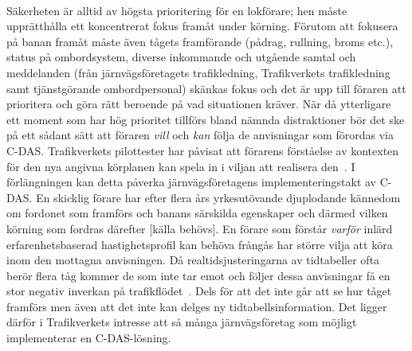 \paragraph{}
Säkerheten är alltid av högsta prioritering för en lokförare; hen måste upprätthålla ett koncentrerat fokus framåt under körning.
Förutom att fokusera på banan framåt måste även tågets framförande (pådrag, rullning, broms etc.), status på ombordsystem, diverse inkommande och utgående samtal och meddelanden (från järnvägsföretagets trafikledning, Trafikverkets trafikledning samt tjänstgörande ombordpersonal) skänkas fokus och det är upp till föraren att prioritera och göra rätt beroende på vad situationen kräver.
När då ytterligare ett moment som har hög prioritet tillförs bland nämnda distraktioner bör det ske på ett sådant sätt att föraren \emph{vill} och \emph{kan} följa de anvisningar som förordas via C-DAS\@.
Trafikverkets pilottester har påvisat att förarens förståelse av kontexten för den nya angivna körplanen kan spela in i viljan att realisera den~\cite{Angel2020, Lindmark2022}.
I förlängningen kan detta påverka järnvägsföretagens implementeringstakt av C-DAS\@.
En skicklig förare har efter flera års yrkesutövande djuplodande kännedom om fordonet som framförs och banans särskilda egenskaper och därmed vilken körning som fordras därefter [källa behövs].
En förare som förstår \emph{varför} inlärd erfarenhetsbaserad hastighetsprofil kan behöva frångås har större vilja att köra inom den mottagna anvisningen.
Då realtidsjusteringarna av tidtabeller ofta berör flera tåg kommer de som inte tar emot och följer dessa anvisningar få en stor negativ inverkan på trafikflödet~\cite{Joborn2023}.
Dels för att det inte går att se hur tåget framförs men även att det inte kan delges ny tidtabellsinformation.
Det ligger därför i Trafikverkets intresse att så många järnvägsföretag som möjligt implementerar en C-DAS-lösning.
